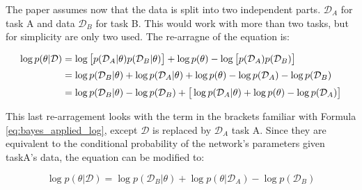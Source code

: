 The paper assumes now that the data is split into two independent parts. $\mathcal{D}_A$ for task A and data $\mathcal{D}_B$ for task B.
This would work with more than two tasks, but for simplicity are only two used.
The re-arragne of the equation is: \cite{elastic-weight-consolidation, schaeffer_ewc}

\begin{equation}
    \setlength{\jot}{5pt}
    \begin{split}
        \log p(\theta | \mathcal{D}) 
        & = \log \big[
                p(\mathcal{D}_A | \theta) p(\mathcal{D}_B | \theta)
                \big]
            + \log p(\theta)
            - \log \big[
                p(\mathcal{D}_A) p(\mathcal{D}_B) 
             \big]
        \\
        & = \log p(\mathcal{D}_B | \theta)
            + \log p(\mathcal{D}_A | \theta)
            + \log p(\theta)
            - \log p(\mathcal{D}_A)
            - \log p(\mathcal{D}_B)
        \\
        & = \log p(\mathcal{D}_B | \theta)
            - \log p(\mathcal{D}_B)
            + \big[
                \log p(\mathcal{D}_A | \theta)
                + \log p(\theta)
                - \log p(\mathcal{D}_A)
                \big]
    \end{split}
\end{equation}

This last re-arragement looks with the term in the brackets familiar with Formula \eqref{eq:bayes_applied_log}, except $\mathcal{D}$ is replaced by $\mathcal{D}_A$ task A.
Since they are equivalent to the conditional probability of the network's parameters given taskA's data, the equation can be modified to: \cite{elastic-weight-consolidation, schaeffer_ewc}

\begin{equation}
    \log p(\theta | \mathcal{D})=
       \log p(\mathcal{D}_B | \theta)
     + \log p(\theta | \mathcal{D}_A)
     - \log p(\mathcal{D}_B)
    \label{eq:bayesian_modified}
\end{equation}

